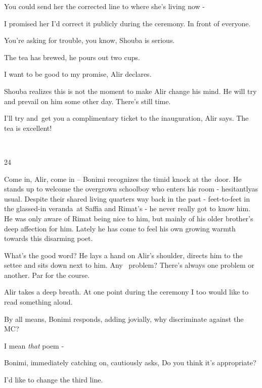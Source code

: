 \documentclass[letterpaper]{article}
\begin{document}
{\textquotedbl}You could send her the corrected line to where she's living now -{\textquotedbl} 

{\textquotedbl}I promised her I'd correct it publicly during the ceremony. In front of everyone.{\textquotedbl}~ 

{\textquotedbl}You're asking for trouble, you know,{\textquotedbl} Shouba is serious.

The tea has brewed, he pours out two cups. 

{\textquotedbl}I want to be good to my promise,{\textquotedbl} Alir declares.

Shouba realizes this is not the moment to make Alir change his mind. He will try and prevail on him some other day.
There's still time. 

{\textquotedbl}I'll try and~get you a complimentary ticket to the inauguration,{\textquotedbl} Alir says.
{\textquotedbl}The tea is excellent!{\textquotedbl}

~

24~

{\textquotedbl}Come in, Alir, come in -- {\textquotedbl} Bonimi recognizes the timid knock at the~door. He stands up to
welcome the overgrown schoolboy who enters his room - hesitantlyas usual. Despite their shared living quarters way back
in the past - feet-to-feet in the glassed-in veranda~at Saffia and Rimat's\textcolor{red}{ }{}- he never really got to
know him. He was only aware of Rimat being nice to him, but mainly of his older brother's deep affection for him.
Lately he has come to feel his own growing warmth towards this disarming poet. 

{\textquotedbl}What's the good word?{\textquotedbl} He lays a hand on Alir's shoulder, directs him to the settee and
sits down next to him. {\textquotedbl}Any \ problem? There's always one problem or another. Par for the
course.{\textquotedbl} 

Alir takes a deep breath. {\textquotedbl}At one point during the ceremony I too would like to read something
aloud.{\textquotedbl} 

{\textquotedbl}By all means,{\textquotedbl} Bonimi responds, adding jovially, {\textquotedbl}why discriminate against
the MC?{\textquotedbl} 

{\textquotedbl}I mean \textit{that} poem -{\textquotedbl} 

Bonimi, immediately catching on, cautiously asks, {\textquotedbl}Do you think it's appropriate?{\textquotedbl} 

{\textquotedbl}I'd like to change the third line.{\textquotedbl} 
\end{document}
